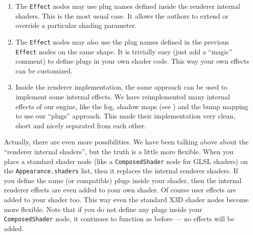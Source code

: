 \documentclass{egpubl}
\begin{document}
\begin{enumerate}

\item The \texttt{Effect} nodes may use plug names
defined inside the renderer internal shaders. This is the most usual case.
It allows the authors to extend or override a particular shading parameter.

\item The \texttt{Effect} nodes may also use the plug names defined
in the previous \texttt{Effect} nodes on the same shape.
It is trivially easy (just add a ``magic'' comment) to define
plugs in your own shader code. This way your own effects
can be customized.

\item Inside the renderer implementation, the same approach can be used
to implement some internal effects.
We have reimplemented many internal effects of our engine,
like the fog, shadow maps (see \cite{vrmleng:shadowmaps})
and the bump mapping to use our ``plugs'' approach.
This made their implementation very clean, short
and nicely separated from each other.



\end{enumerate}

Actually, there are even more possibilities.
We have been talking above about the ``renderer internal shaders'',
but the truth is a little more flexible.
When you place a standard shader node
(like a \texttt{ComposedShader} node for GLSL shaders) on the
\texttt{Appearance.shaders} list,
then it replaces the internal renderer shaders.
If you define the same (or compatible) plugs inside your shader,
then the internal renderer effects are even added to your own
shader. Of course user effects are added to your shader too.
This way even the standard X3D shader nodes become more flexible.
Note that if you do not define any plugs inside your \texttt{ComposedShader} node,
it continues to function as before --- no effects
will be added.
\end{document}
